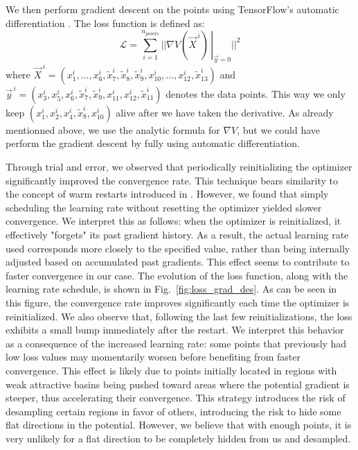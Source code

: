 \documentclass[11pt]{article}
\begin{document}
		We then perform gradient descent on the points using TensorFlow’s automatic differentiation \cite{tensorflow2015-whitepaper}. The loss function is defined as:
		\begin{equation}
			\mathcal{L} = \sum_{i = 1}^{n_{points}} ||\left.\nabla V(\vec{X}^{\,i})\,\right|_{\vec{y}=0}||^2
		\end{equation}
		where $\vec{X}^{\,i} = (x^i_1,\dots,x^i_6,\tilde{x}^i_7,\tilde{x}^i_8,\tilde{x}^i_9,x^i_{10},\dots,x^i_{12},\tilde{x}^i_{13})$ and $\vec{y}^{\,i} = (x^i_3,x^i_5,x^i_6,\tilde{x}^i_7,\tilde{x}^i_9,x^i_{11},x^i_{12},\tilde{x}^i_{11})$ denotes the data points. This way we only keep $(x^i_1,x^i_2,x^i_4,\tilde{x}^i_8,x^i_{10})$ alive after we have taken the derivative. As already mentionned above, we use the analytic formula for $\nabla V$, but we could have perform the gradient descent by fully using automatic differentiation.
		
		Through trial and error, we observed that periodically reinitializing the optimizer significantly improved the convergence rate. This technique bears similarity to the concept of warm restarts introduced in \cite{loshchilov2017sgdrstochasticgradientdescent}. However, we found that simply scheduling the learning rate without resetting the optimizer yielded slower convergence. We interpret this as follows: when the optimizer is reinitialized, it effectively "forgets" its past gradient history. As a result, the actual learning rate used corresponds more closely to the specified value, rather than being internally adjusted based on accumulated past gradients. This effect seems to contribute to faster convergence in our case.  The evolution of the loss function, along with the learning rate schedule, is shown in Fig.~\eqref{fig:loss_grad_des}. As can be seen in this figure, the convergence rate improves significantly each time the optimizer is reinitialized. We also observe that, following the last few reinitializations, the loss exhibits a small bump immediately after the restart. We interpret this behavior as a consequence of the increased learning rate: some points that previously had low loss values may momentarily worsen before benefiting from faster convergence. This effect is likely due to points initially located in regions with weak attractive basins being pushed toward areas where the potential gradient is steeper, thus accelerating their convergence. This strategy introduces the risk of desampling certain regions in favor of others, introducing the risk to hide some flat directions in the potential. However, we believe that with enough points, it is very unlikely for a flat direction to be completely hidden from us and desampled. 
		
\end{document}
